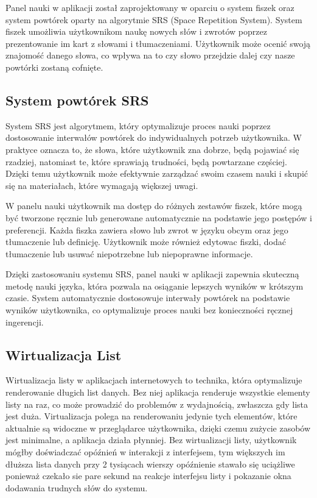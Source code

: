 Panel nauki w aplikacji został zaprojektowany w oparciu o system fiszek oraz system powtórek oparty na algorytmie SRS (Space Repetition System). System fiszek umożliwia użytkownikom naukę nowych słów i zwrotów poprzez prezentowanie im kart z słowami i tłumaczeniami. Użytkownik może ocenić swoją znajomość danego słowa, co wpływa na to czy słowo przejdzie dalej czy nasze powtórki zostaną cofnięte.

\subsection*{System powtórek SRS}

System SRS jest algorytmem, który optymalizuje proces nauki poprzez dostosowanie interwałów powtórek do indywidualnych potrzeb użytkownika. W praktyce oznacza to, że słowa, które użytkownik zna dobrze, będą pojawiać się rzadziej, natomiast te, które sprawiają trudności, będą powtarzane częściej. Dzięki temu użytkownik może efektywnie zarządzać swoim czasem nauki i skupić się na materiałach, które wymagają większej uwagi.

W panelu nauki użytkownik ma dostęp do różnych zestawów fiszek, które mogą być tworzone ręcznie lub generowane automatycznie na podstawie jego postępów i preferencji. Każda fiszka zawiera słowo lub zwrot w języku obcym oraz jego tłumaczenie lub definicję. Użytkownik może również edytowac fiszki, dodać tłumaczenie lub usuwać niepotrzebne lub niepoprawne informacje.

Dzięki zastosowaniu systemu SRS, panel nauki w aplikacji zapewnia skuteczną metodę nauki języka, która pozwala na osiąganie lepszych wyników w krótszym czasie. System automatycznie dostosowuje interwały powtórek na podstawie wyników użytkownika, co optymalizuje proces nauki bez konieczności ręcznej ingerencji.

\subsection{Wirtualizacja List}
Wirtualizacja listy w aplikacjach internetowych to technika, która optymalizuje renderowanie długich list danych. Bez niej aplikacja renderuje wszystkie elementy listy na raz, co może prowadzić do problemów z wydajnością, zwłaszcza gdy lista jest duża. Virtualizacja polega na renderowaniu jedynie tych elementów, które aktualnie są widoczne w przeglądarce użytkownika, dzięki czemu zużycie zasobów jest minimalne, a aplikacja działa płynniej. Bez wirtualizacji listy, użytkownik mógłby doświadczać opóźnień w interakcji z interfejsem, tym większych im dłuższa lista danych przy 2 tysiącach wierszy opóźnienie stawało się uciążliwe ponieważ czekało sie pare sekund na reakcje interfejsu listy i pokazanie okna dodawania trudnych słów do systemu.

